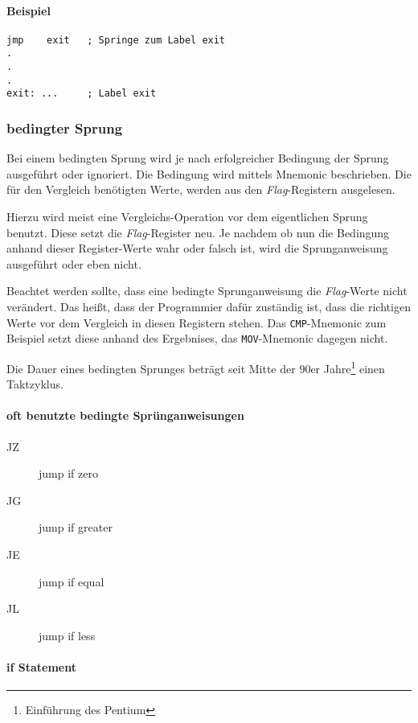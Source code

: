 \paragraph{Beispiel\newline}\makebox{}
\begin{lstlisting}
jmp    exit   ; Springe zum Label exit
.
.
.
exit: ...     ; Label exit
\end{lstlisting}

\subsubsection{bedingter Sprung}
Bei einem bedingten Sprung wird je nach erfolgreicher Bedingung der Sprung ausgeführt oder ignoriert. Die Bedingung wird mittels Mnemonic beschrieben. Die für den Vergleich benötigten Werte, werden aus den \textit{Flag}-Registern ausgelesen.

Hierzu wird meist eine Vergleichs-Operation vor dem eigentlichen Sprung benutzt. Diese setzt die \textit{Flag}-Register neu. Je nachdem ob nun die Bedingung anhand dieser Register-Werte wahr oder falsch ist, wird die Sprunganweisung ausgeführt oder eben nicht. 

Beachtet werden sollte, dass eine bedingte Sprunganweisung die \textit{Flag}-Werte nicht verändert. Das heißt, dass der Programmier dafür zuständig ist, dass die richtigen Werte vor dem Vergleich in diesen Registern stehen. Das \texttt{CMP}-Mnemonic zum Beispiel setzt diese anhand des Ergebnises, das \texttt{MOV}-Mnemonic dagegen nicht.

Die Dauer eines bedingten Sprunges beträgt seit Mitte der 90er Jahre\footnote{Einführung des Pentium} einen Taktzyklus.

\paragraph{oft benutzte bedingte Sprünganweisungen}
\begin{description}
	\item [JZ] jump if zero
	\item [JG] jump if greater 
	\item [JE] jump if equal 
	\item [JL] jump if less 
\end{description}

\paragraph{if Statement}

